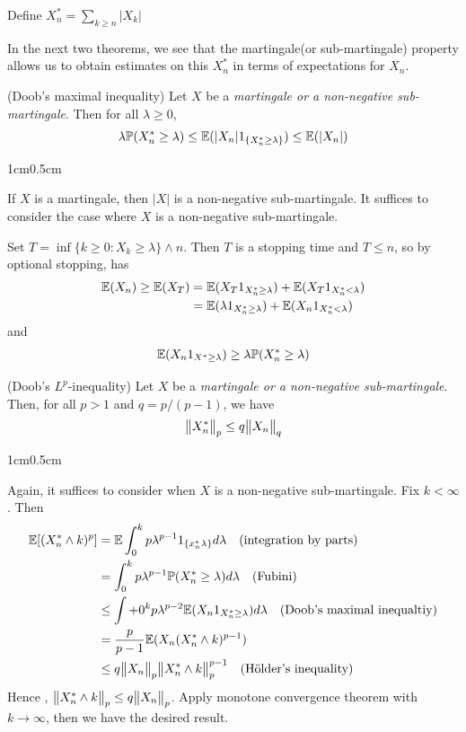 \documentclass[12pt,a4paper]{report}
\newenvironment{proof}
{\begin{changemargin}{1cm}{0.5cm} 
	}%
	{\end{changemargin}
}
\begin{document}
\quad Define $X_n^* = \sum_{k\geq n} |X_k|$
\s

In the next two theorems, we see that the martingale(or sub-martingale) property allows us to obtain estimates on this $X_n^*$ in terms of expectations for $X_n$.\\
\s

 (Doob's maximal inequality) Let $X$ be a \emph{martingale or a non-negative sub-martingale}. Then for all $\lambda \geq 0$,
\begin{align*}
\lambda \mathbb{P}(X_n^* \geq \lambda) \leq \mathbb{E}(|X_n|   1_{\{ X_n^*\geq \lambda \}}) \leq \mathbb{E}(|X_n|)
\end{align*}
\begin{proof}
\pf If $X$ is a martingale, then $|X|$ is a non-negative sub-martingale. It suffices to consider the case where $X$ is a non-negative sub-martingale.

\quad Set $T = \inf \{ k \geq 0 : X_k \geq \lambda \} \wedge n$. Then $T$ is a stopping time and $T\leq n$, so by optional stopping, has
\begin{align*}
\mathbb{E}(X_n) \geq \mathbb{E}(X_T) &= \mathbb{E}(X_T 1_{X^*_n \geq \lambda}) + \mathbb{E}(X_T 1_{X^*_n < \lambda}) \\
& = \mathbb{E}( \lambda 1_{X^*_n \geq \lambda})  + \mathbb{E}(X_n 1_{X_n^* < \lambda})
\end{align*}
and
\begin{align*}
\mathbb{E}(X_n 1_{X^* \geq \lambda}) \geq \lambda \mathbb{P}(X^*_n \geq \lambda)
\end{align*}

\eop
\end{proof}
\s

 (Doob's $L^p$-inequality) Let $X$ be a \emph{martingale or a non-negative sub-martingale}. Then, for all $p>1$ and $q = p/(p-1)$, we have
\begin{align*}
\bigl\lVert X^*_n\bigr\rVert_{p} \leq q \bigl\lVert X_n\bigr\rVert_{q} 
\end{align*}
\begin{proof}
\pf Again, it suffices to consider when $X$ is a non-negative sub-martingale. Fix $k < \infty$. Then
\begin{align*}
\mathbb{E} [ (X^*_n \wedge k)^p  ] &= \mathbb{E} \int_0^k p \lambda^{p-1} 1_{\{x^*_n \lambda \}} d\lambda \quad \text{(integration by parts)}\\
& = \int_0^k p \lambda^{p-1} \mathbb{P}(X^*_n \geq \lambda) d\lambda \quad \text{(Fubini)} \\
& \leq \int+0^k p\lambda^{p-2} \mathbb{E} (X_n 1_{X^*_n \geq \lambda}) d\lambda \quad \text{(Doob's maximal inequaltiy)} \\
& =\frac{p}{p-1} \mathbb{E}(X_n (X^*_n \wedge k)^{p-1} ) \\
& \leq q \bigl\lVert X_n\bigr\rVert_{p} \bigl\lVert X^*_n \wedge k\bigr\rVert_{p}^{p-1} \quad \text{(H\"{o}lder's inequality)}
\end{align*}
Hence , $\bigl\lVert X^*_n \wedge k\bigr\rVert_{p} \leq q\bigl\lVert X_n\bigr\rVert_{p}$. Apply monotone convergence theorem with $k\rightarrow \infty$, then we have the desired result.

\eop
\end{proof}
\s
\end{document}
